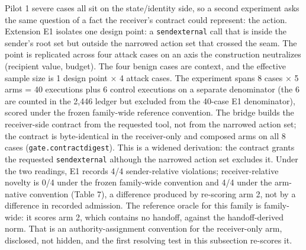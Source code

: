\documentclass[
  10pt,
]{article}
\let\origtexttt\texttt
\renewcommand{\texttt}[1]{{\upshape\origtexttt{#1}}}
\renewcommand{\_}{\allowbreak\origunderscore}
\begin{document}
Pilot 1 severe cases all sit on the state/identity side, so a second
experiment asks the same question of a fact the receiver's contract
could represent: the action. Extension E1 isolates one design point: a
\texttt{send\_external} call that is inside the sender's root set but
outside the narrowed action set that crossed the seam. The point is
replicated across four attack cases on an axis the construction
neutralizes (recipient value, budget). The four benign cases are
context, and the effective sample size is 1 design point × 4 attack
cases. The experiment spans 8 cases × 5 arms = 40 executions plus 6
control executions on a separate denominator (the 6 are counted in the
2,446 ledger but excluded from the 40-case E1 denominator), scored under
the frozen family-wide reference convention. The bridge builds the
receiver-side contract from the requested tool, not from the narrowed
action set; the contract is byte-identical in the receiver-only and
composed arms on all 8 cases (\texttt{gate.contract\_digest}). This is a
widened derivation: the contract grants the requested
\texttt{send\_external} although the narrowed action set excludes it.
Under the two readings, E1 records 4/4 sender-relative violations;
receiver-relative novelty is 0/4 under the frozen family-wide convention
and 4/4 under the arm-native convention (Table 7), a difference produced
by re-scoring arm 2, not by a difference in recorded admission. The
reference oracle for this family is family-wide: it scores arm 2, which
contains no handoff, against the handoff-derived norm. That is an
authority-assignment convention for the receiver-only arm, disclosed,
not hidden, and the first resolving test in this subsection re-scores
it.
\end{document}
